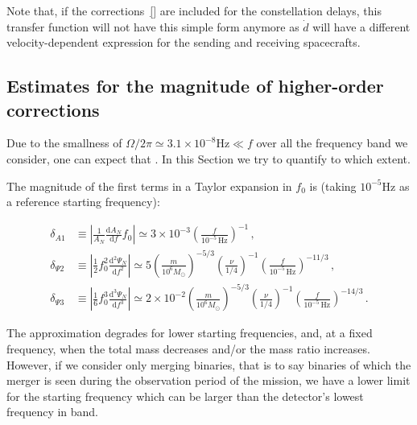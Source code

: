 \documentclass[aps,showpacs,%
prd,superscriptaddress,nofootinbib]{revtex4}
\newcommand\ud{{\mathrm{d}}}
\newcommand{\Hz}{\,\mathrm{Hz}}
\newcommand{\Msol}{M_{\odot}}
\begin{document}
Note that, if the corrections~\eqref{} are included for the constellation delays, this transfer function will not have this simple form anymore as $\dot{d}$ will have a different velocity-dependent expression for the sending and receiving spacecrafts.


\subsection{Estimates for the magnitude of higher-order corrections}
\label{subsec:sizecorrLISA}

Due to the smallness of $\Omega/2\pi \simeq 3.1\times10^{-8}\mathrm{Hz} \ll f$ over all the frequency band we consider, one can expect that . In this Section we try to quantify to which extent. 

The magnitude of the first terms in a Taylor expansion in $f_{0}$ is (taking $10^{-5}\mathrm{Hz}$ as a reference starting frequency):
%
\begin{widetext}
\begin{subequations}
\begin{align}
	\delta_{A1} &\equiv \left| \frac{1}{A_{N}}\frac{\ud A_{N}}{\ud f} f_0 \right| \simeq 3\times10^{-3} \left(\frac{f}{10^{-5}\Hz}\right)^{-1} \,,\\
	\delta_{\Psi 2} &\equiv \left| \frac{1}{2} f_0^{2}\frac{\ud^{2} \Psi_{N}}{\ud f^{2}} \right| \simeq 5 \left( \frac{m}{10^{6}\Msol} \right)^{-5/3} \left( \frac{\nu}{1/4} \right)^{-1} \left( \frac{f}{10^{-5}\Hz} \right)^{-11/3} \,, \\
	\delta_{\Psi 3} &\equiv \left| \frac{1}{6} f_0^{3}\frac{\ud^{3} \Psi_{N}}{\ud f^{3}} \right| \simeq 2\times 10^{-2} \left( \frac{m}{10^{6}\Msol} \right)^{-5/3} \left( \frac{\nu}{1/4} \right)^{-1} \left( \frac{f}{10^{-5}\Hz} \right)^{-14/3} \,.
\end{align}
\end{subequations}
\end{widetext}
%
The approximation degrades for lower starting frequencies, and, at a fixed frequency, when the total mass decreases and/or the mass ratio increases. However, if we consider only merging binaries, that is to say binaries of which the merger is seen during the observation period of the mission, we have a lower limit for the starting frequency which can be larger than the detector's lowest frequency in band.
\end{document}
